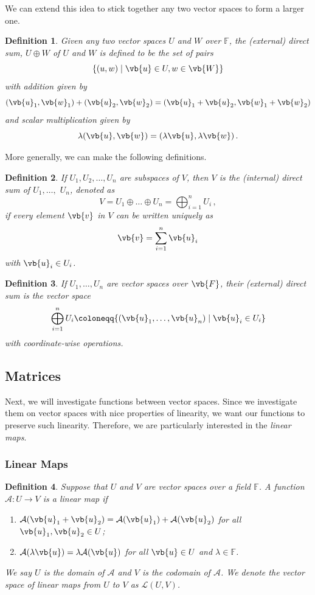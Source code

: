 \documentclass{article}
\theoremstyle{plain}\theoremheaderfont{\normalfont\itshape}\theorembodyfont{\rmfamily}\theoremseparator{.}\newtheorem*{rem}{Remark}\newtheorem*{ex}{Example}\newtheorem*{proof}{Proof}\newtheorem*{altp}{Alternative proof}
\theoremstyle{plain}\theoremheaderfont{\normalfont\bfseries}\theorembodyfont{\rmfamily}\theoremseparator{.}\newtheorem{thm}{Theorem}[section]\newtheorem{lem}[thm]{Lemma}\newtheorem{prop}[thm]{Proposition}\newtheorem*{cor}{Corollary}\newtheorem{defn}[thm]{Definition}\newtheorem{clm}[thm]{Claim}\newtheorem{clminproof}{Claim}
\theoremstyle{break}\theoremheaderfont{\normalfont\itshape}\theorembodyfont{\rmfamily}\theoremseparator{.\medskip}\newtheorem*{proofskip}{Proof}\newtheorem*{exs}{Examples}\newtheorem*{rems}{Remarks}
\theoremstyle{break}\theoremheaderfont{\normalfont\bfseries}\theorembodyfont{\rmfamily}\theoremseparator{.\medskip}\newtheorem{lemskip}[thm]{Lemma}\newtheorem{defnskip}[thm]{Definition}\newtheorem{propskip}[thm]{Proposition}\newtheorem{thmskip}[thm]{Theorem}
\numberwithin{equation}{section}
\begin{document}
	We can extend this idea to stick together any two vector spaces to form a larger one.
	\begin{defn}
		Given any two vector spaces \(U\) and \(W\) over \(\mathbb{F}\), the \textit{(external) direct sum}, \(U \oplus W\) of \(U\) and \(W\) is defined to be the set of pairs
		\[\{(u, w) \mid \vb{u}\in U, w \in \vb{W}\}\]
		with addition given by
		\[(\vb{u}_1, \vb{w}_1) + (\vb{u}_2, \vb{w}_2) = (\vb{u}_1 + \vb{u}_2, \vb{w}_1 + \vb{w}_2)\]
		and scalar multiplication given by
		\[\lambda(\vb{u}, \vb{w}) = (\lambda\vb{u},\lambda\vb{w})\,.\]
	\end{defn}

	More generally, we can make the following definitions.

	\begin{defn}
		If \(U_1, U_2,\dots, U_n\) are subspaces of \(V\), then \(V\) is the \textit{(internal) direct sum} of \(U_1,\dots,\) \(U_n\), denoted as
		\[V=U_1\oplus\dots\oplus U_n =\bigoplus_{i=1}^{n}U_i\,,\]
		if every element \(\vb{v}\) in \(V\) can be written uniquely as
		\[\vb{v}=\sum_{i=1}^{n}\vb{u}_i\]
		with \(\vb{u}_i\in U_i\).
	\end{defn}
	\begin{defn}
		If \(U_1,\dots,U_n\) are vector spaces over \(\vb{F}\), their \textit{(external) direct sum} is the vector space
		\[\bigoplus_{i=1}^{n}U_i\coloneqq\{(\vb{u}_1,\dots,\vb{u}_n)\mid \vb{u}_i\in U_i\}\]
		with coordinate-wise operations.
	\end{defn}

	\subsection{Matrices}
	Next, we will investigate functions between vector spaces. Since we investigate them on vector spaces with nice properties of linearity, we want our functions to preserve such linearity. Therefore, we are particularly interested in the \textit{linear maps}.
	\subsubsection{Linear Maps}
	\begin{defn}
		Suppose that \(U\) and \(V\) are vector spaces over a field \(\mathbb{F}\). A function
		\(\mathcal{A}: U\to V\) is a \textit{linear map} if
		\begin{enumerate}[topsep=0pt]
			\item \(\mathcal{A}(\vb{u}_1+\vb{u}_2)=\mathcal{A}(\vb{u}_1)+\mathcal{A}(\vb{u}_2)\) for all \(\vb{u}_1,\vb{u}_2\in U\);
			\item \(\mathcal{A}(\lambda\vb{u})=\lambda\mathcal{A}(\vb{u})\) for all \(\vb{u}\in U\) and \(\lambda\in\mathbb{F}\).
		\end{enumerate}
		We say \(U\) is the \textit{domain} of \(\mathcal{A}\) and \(V\) is the \textit{codomain} of \(\mathcal{A}\). We denote the vector space of linear maps from \(U\) to \(V\) as \(\mathcal{L}(U,V)\).
	\end{defn}
\end{document}

